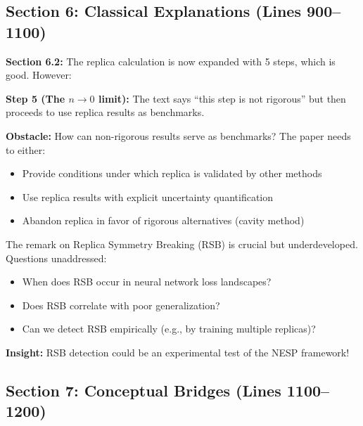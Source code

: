\documentclass[11pt]{article}
\begin{document}
\subsection{Section 6: Classical Explanations (Lines 900--1100)}

\begin{handwavebox}
\textbf{Section 6.2:} The replica calculation is now expanded with 5 steps, which is good. However:

\textbf{Step 5 (The $n \to 0$ limit):} The text says ``this step is not rigorous'' but then proceeds to use replica results as benchmarks.

\textbf{Obstacle:} How can non-rigorous results serve as benchmarks? The paper needs to either:
\begin{itemize}
    \item Provide conditions under which replica is validated by other methods
    \item Use replica results with explicit uncertainty quantification
    \item Abandon replica in favor of rigorous alternatives (cavity method)
\end{itemize}
\end{handwavebox}

\begin{missingbox}
The remark on Replica Symmetry Breaking (RSB) is crucial but underdeveloped. Questions unaddressed:
\begin{itemize}
    \item When does RSB occur in neural network loss landscapes?
    \item Does RSB correlate with poor generalization?
    \item Can we detect RSB empirically (e.g., by training multiple replicas)?
\end{itemize}

\textbf{Insight:} RSB detection could be an experimental test of the NESP framework!
\end{missingbox}

\subsection{Section 7: Conceptual Bridges (Lines 1100--1200)}
\end{document}
